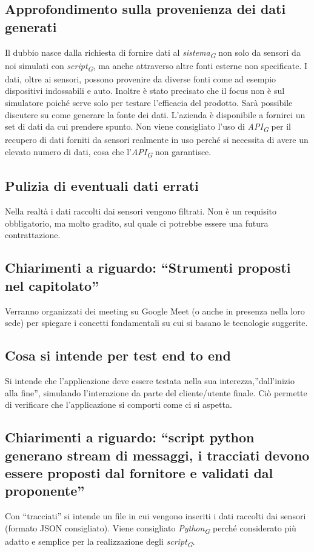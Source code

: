 \documentclass{article}
\begin{document}
    \subsection{Approfondimento sulla provenienza dei dati generati}
        Il dubbio nasce dalla richiesta di fornire dati al \textit{sistema}\textsubscript{\textit{G}} non solo da sensori da noi simulati con \textit{script}\textsubscript{\textit{G}}, ma anche attraverso altre fonti esterne non specificate.
        I dati, oltre ai sensori, possono provenire da diverse fonti come ad esempio dispositivi indossabili e auto. 
        Inoltre è stato precisato che il focus non è sul simulatore poiché serve solo per testare l’efficacia del prodotto.
        Sarà possibile discutere su come generare la fonte dei dati. L’azienda è disponibile a fornirci un set di dati da cui prendere spunto.
        Non viene consigliato l’uso di \textit{API}\textsubscript{\textit{G}} per il recupero di dati forniti da sensori realmente in uso perché si necessita di avere un elevato numero di dati, cosa che l’\textit{API}\textsubscript{\textit{G}} non garantisce. \subsection{Pulizia di eventuali dati errati} 
        Nella realtà i dati raccolti dai sensori vengono filtrati. Non è un requisito obbligatorio, ma molto gradito, sul quale ci potrebbe essere una futura contrattazione. \subsection{Chiarimenti a riguardo: “Strumenti proposti nel capitolato”} 
        Verranno organizzati dei meeting su Google Meet (o anche in presenza nella loro sede) per spiegare i concetti fondamentali su cui si basano le tecnologie suggerite. 
    
    \subsection{Cosa si intende per test end to end}
        Si intende che l’applicazione deve essere testata nella sua interezza,”dall’inizio alla fine”, simulando l’interazione da parte del cliente/utente finale. Ciò permette di verificare che l’applicazione si comporti come ci si aspetta. 

    \subsection{Chiarimenti a riguardo: “script python generano stream di messaggi, i tracciati devono essere proposti dal fornitore e validati dal proponente”}
        Con “tracciati” si intende un file in cui vengono inseriti i dati raccolti dai sensori (formato JSON consigliato). Viene consigliato \textit{Python}\textsubscript{\textit{G}} perché considerato più adatto e semplice per la realizzazione degli \textit{script}\textsubscript{\textit{G}}. 
    
\end{document}
